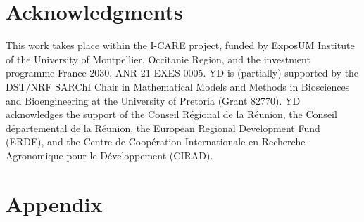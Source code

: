 \documentclass{article}
\theoremstyle{definition}
\theoremstyle{remark}
\begin{document}
\section*{Acknowledgments}
This work takes place within the I-CARE project, funded by ExposUM Institute of the University of Montpellier, Occitanie Region, and the investment programme France 2030, ANR-21-EXES-0005. YD is (partially) supported by the DST/NRF SARChI Chair in Mathematical Models and Methods in Biosciences and Bioengineering at the University of Pretoria (Grant 82770). YD acknowledges the support of the Conseil R\'egional de la R\'eunion, the Conseil d\'epartemental de la R\'eunion, the European Regional Development Fund (ERDF), and the Centre de Coop\'eration Internationale en Recherche Agronomique pour le D\'eveloppement (CIRAD).

\newpage
\section*{Appendix}
\end{document}
